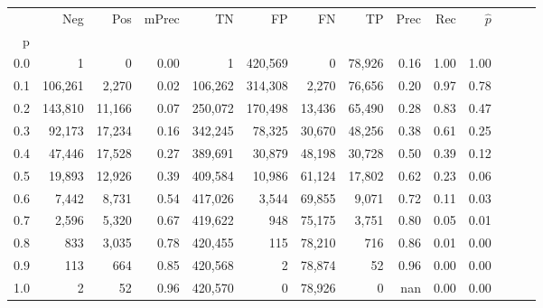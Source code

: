 \begin{tabular}{rrrrrrrrrrrrrr}
\toprule
{} &      Neg &     Pos & mPrec &       TN &       FP &      FN &      TP &  Prec &   Rec & $\hat{p}$ \\
p   &          &         &       &          &          &         &         &       &       &           \\
\midrule
0.0 &        1 &       0 &  0.00 &        1 &  420,569 &       0 &  78,926 &  0.16 &  1.00 &      1.00 \\
0.1 &  106,261 &   2,270 &  0.02 &  106,262 &  314,308 &   2,270 &  76,656 &  0.20 &  0.97 &      0.78 \\
0.2 &  143,810 &  11,166 &  0.07 &  250,072 &  170,498 &  13,436 &  65,490 &  0.28 &  0.83 &      0.47 \\
0.3 &   92,173 &  17,234 &  0.16 &  342,245 &   78,325 &  30,670 &  48,256 &  0.38 &  0.61 &      0.25 \\
0.4 &   47,446 &  17,528 &  0.27 &  389,691 &   30,879 &  48,198 &  30,728 &  0.50 &  0.39 &      0.12 \\
0.5 &   19,893 &  12,926 &  0.39 &  409,584 &   10,986 &  61,124 &  17,802 &  0.62 &  0.23 &      0.06 \\
0.6 &    7,442 &   8,731 &  0.54 &  417,026 &    3,544 &  69,855 &   9,071 &  0.72 &  0.11 &      0.03 \\
0.7 &    2,596 &   5,320 &  0.67 &  419,622 &      948 &  75,175 &   3,751 &  0.80 &  0.05 &      0.01 \\
0.8 &      833 &   3,035 &  0.78 &  420,455 &      115 &  78,210 &     716 &  0.86 &  0.01 &      0.00 \\
0.9 &      113 &     664 &  0.85 &  420,568 &        2 &  78,874 &      52 &  0.96 &  0.00 &      0.00 \\
1.0 &        2 &      52 &  0.96 &  420,570 &        0 &  78,926 &       0 &   nan &  0.00 &      0.00 \\
\bottomrule
\end{tabular}
